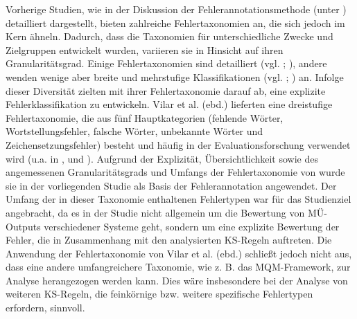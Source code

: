 Vorherige Studien, wie in der Diskussion der Fehlerannotationsmethode (unter ) detailliert dargestellt, bieten zahlreiche Fehlertaxonomien an, die sich jedoch im Kern ähneln. Dadurch, dass die Taxonomien für unterschiedliche Zwecke und Zielgruppen entwickelt wurden, variieren sie in Hinsicht auf ihren Granularitätsgrad. Einige Fehlertaxonomien sind detailliert (vgl. \citealt{Flanagan1994}; \citealt{Correa2003}), andere wenden wenige aber breite und mehrstufige Klassifikationen (vgl. \citealt{VilarEtAl2006}; \citealt{FarrúsEtAl2010}) an. Infolge dieser Diversität zielten \citet{VilarEtAl2006} mit ihrer Fehlertaxonomie darauf ab, eine explizite Fehlerklassifikation zu entwickeln. Vilar et al. (ebd.) lieferten eine dreistufige Fehlertaxonomie, die aus fünf Hauptkategorien (fehlende Wörter, Wortstellungsfehler, falsche Wörter, unbekannte Wörter und Zeichensetzungsfehler) besteht und häufig in der Evaluationsforschung verwendet wird (u.a. in \citealt{AvramidisKöhn2008}, \citealt{Bojar2011} und \citealt{PopovićBurchardt2011}). Aufgrund der Explizität, Übersichtlichkeit sowie des angemessenen Granularitätsgrads und Umfangs der Fehlertaxonomie von \citet{VilarEtAl2006} wurde sie in der vorliegenden Studie als Basis der Fehlerannotation angewendet. Der Umfang der in dieser Taxonomie enthaltenen Fehlertypen war für das Studienziel angebracht, da es in der Studie nicht allgemein um die Bewertung von MÜ-Outputs verschiedener Systeme geht, sondern um eine explizite Bewertung der Fehler, die in Zusammenhang mit den analysierten KS-Regeln auftreten. Die Anwendung der Fehlertaxonomie von Vilar et al. (ebd.) schließt jedoch nicht aus, dass eine andere umfangreichere Taxonomie, wie z. B. das MQM-Framework, zur Analyse herangezogen werden kann. Dies wäre insbesondere bei der Analyse von weiteren KS-Regeln, die feinkörnige bzw. weitere spezifische Fehlertypen erfordern, sinnvoll.

